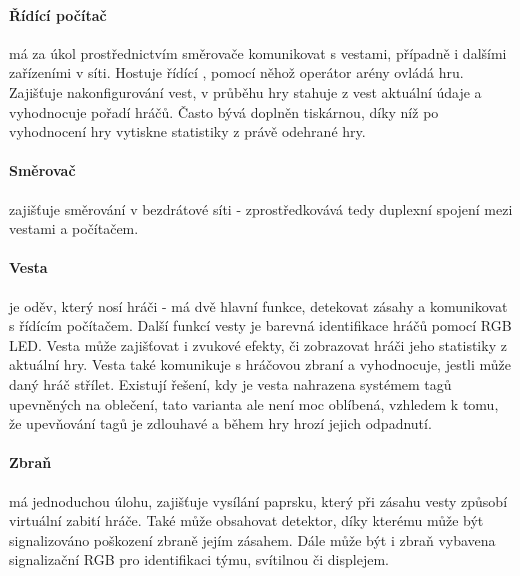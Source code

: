 \paragraph{Řídící počítač}
má za úkol prostřednictvím směrovače komunikovat s vestami, případně i dalšími zařízeními v síti. Hostuje řídící , pomocí něhož operátor arény ovládá hru. Zajišťuje nakonfigurování vest, v průběhu hry stahuje z vest aktuální údaje a vyhodnocuje pořadí hráčů. Často bývá doplněn tiskárnou, díky níž po vyhodnocení hry vytiskne statistiky z právě odehrané hry.

\paragraph{Směrovač}
zajišťuje směrování v bezdrátové síti - zprostředkovává tedy duplexní spojení mezi vestami a počítačem.

\paragraph{Vesta}
je oděv, který nosí hráči - má dvě hlavní funkce, detekovat zásahy a komunikovat s řídícím počítačem. Další funkcí vesty je barevná identifikace hráčů pomocí RGB LED. Vesta může zajišťovat i zvukové efekty, či zobrazovat hráči jeho statistiky z aktuální hry. Vesta také komunikuje s hráčovou zbraní a vyhodnocuje, jestli může daný hráč střílet. Existují řešení, kdy je vesta nahrazena systémem tagů upevněných na oblečení, tato varianta ale není moc oblíbená, vzhledem k tomu, že upevňování tagů je zdlouhavé a během hry hrozí jejich odpadnutí.

\paragraph{Zbraň}
má jednoduchou úlohu, zajišťuje vysílání  paprsku, který při zásahu vesty způsobí virtuální zabití hráče. Také může obsahovat  detektor, díky kterému může být signalizováno poškození zbraně jejím zásahem. Dále může být i zbraň vybavena signalizační RGB  pro identifikaci týmu, svítilnou či displejem.
